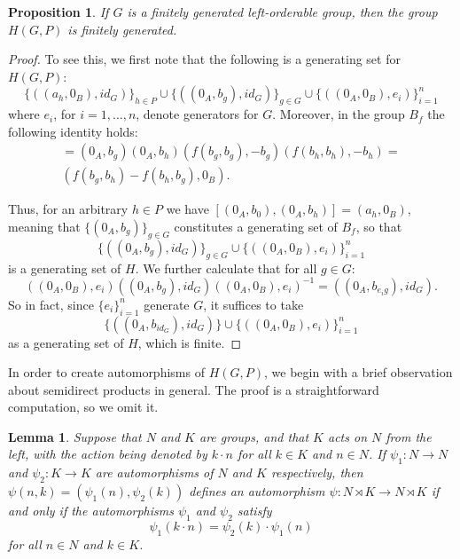 \documentclass{amsart}
\newtheorem{lemma}[theorem]{Lemma}
\newtheorem{proposition}[theorem]{Proposition}
\theoremstyle{definition}
\theoremstyle{remark}
\begin{document}
\begin{proposition}
   If $G$ is a finitely generated left-orderable group, then the group $H(G,P)$ is finitely generated.
\end{proposition}
\begin{proof}
    To see this, we first note that the following is a generating set for $H(G,P)$:
\[ \{ ((a_h, 0_B), id_G)\}_{h \in P} \cup \{ ((0_A, b_g), id_G)\}_{g \in G} \cup \{((0_A, 0_B), e_i) \}_{i=1}^n
\]
where $e_i$, for \(i=1,\dotsc,n\), denote generators for \(G\).  Moreover, in the group $B_f$ the following identity holds:
\begin{multline*}
     [(0_A, b_g), (0_A, b_h)] = (0_A, b_g)(0_A, b_h)(f(b_g, b_g), -b_g)(f(b_h, b_h), -b_h) =\\
     (f(b_g, b_h)-f(b_h, b_g), 0_B).
\end{multline*} 


Thus, for an arbitrary $h \in P$ we have $[(0_A, b_0), (0_A, b_h)] = (a_h, 0_B)$, meaning that $\{ (0_A, b_g) \}_{g \in G}$ constitutes a generating set of $B_f$, so that 
\[\{ ((0_A, b_g), id_G)\}_{g \in G} \cup \{((0_A, 0_B), e_i) \}_{i=1}^n
\]
is a generating set of $H$.  We further calculate that for all $g \in G$:
\[ ((0_A,0_B), e_i)((0_A, b_g), id_G)((0_A,0_B), e_i)^{-1} = 
((0_A, b_{e_ig}), id_G).
\]
So in fact, since $\{e_i\}_{i=1}^n$ generate $G$, it suffices to take 
\[\{ ((0_A, b_{id_G}), id_G)\} \cup \{((0_A, 0_B), e_i) \}_{i=1}^n
\]
as a generating set of $H$, which is finite.
\end{proof}

In order to create automorphisms of $H(G,P)$, we begin with a brief observation about semidirect products in general.  The proof is a straightforward computation, so we omit it.

\begin{lemma}
\label{lem:aut2}
Suppose that $N$ and $K$ are groups, and that $K$ acts on $N$ from the left, with the action being denoted by $k \cdot n$ for all $k \in K$ and $n \in N$.  If $\psi_1 \colon N \rightarrow N$ and $\psi_2 \colon K \rightarrow K$ are automorphisms of $N$ and $K$ respectively, then $\psi(n, k) = (\psi_1(n), \psi_2(k))$ defines an automorphism $\psi\colon N \rtimes K \rightarrow N \rtimes K$ if and only if the automorphisms $\psi_1$ and $\psi_2$ satisfy
\[ \psi_1(k \cdot n) = \psi_2(k) \cdot \psi_1(n)
\]
for all $n \in N$ and $k \in K$.
\end{lemma}
\end{document}
